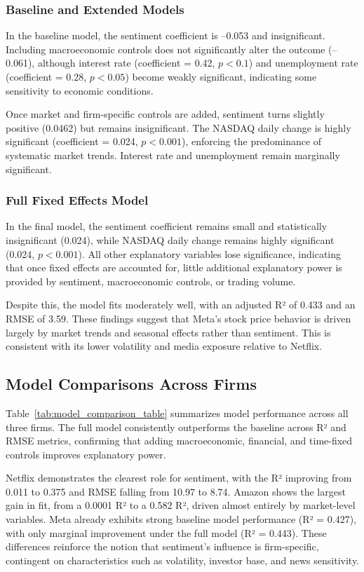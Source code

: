 \documentclass[12pt]{article}
\begin{document}
\subsubsection{Baseline and Extended Models
}
In the baseline model, the sentiment coefficient is –0.053 and insignificant. Including macroeconomic controls does not significantly alter the outcome (–0.061), although interest rate (coefficient = 0.42, $p < 0.1$) and unemployment rate (coefficient = 0.28, $p < 0.05$) become weakly significant, indicating some sensitivity to economic conditions.

Once market and firm-specific controls are added, sentiment turns slightly positive (0.0462) but remains insignificant. The NASDAQ daily change is highly significant (coefficient = 0.024, $p < 0.001$), enforcing the predominance of systematic market trends. Interest rate and unemployment remain marginally significant.

\subsubsection{Full Fixed Effects Model
}
In the final model, the sentiment coefficient remains small and statistically insignificant (0.024), while NASDAQ daily change remains highly significant (0.024, $p < 0.001$). All other explanatory variables lose significance, indicating that once fixed effects are accounted for, little additional explanatory power is provided by sentiment, macroeconomic controls, or trading volume.

Despite this, the model fits moderately well, with an adjusted R² of 0.433 and an RMSE of 3.59. These findings suggest that Meta’s stock price behavior is driven largely by market trends and seasonal effects rather than sentiment. This is consistent with its lower volatility and media exposure relative to Netflix.

\subsection{Model Comparisons Across Firms}
Table~\ref{tab:model_comparison_table} summarizes model performance across all three firms. The full model consistently outperforms the baseline across R² and RMSE metrics, confirming that adding macroeconomic, financial, and time-fixed controls improves explanatory power.

Netflix demonstrates the clearest role for sentiment, with the R² improving from 0.011 to 0.375 and RMSE falling from 10.97 to 8.74. Amazon shows the largest gain in fit, from a 0.0001 R² to a 0.582 R², driven almost entirely by market-level variables. Meta already exhibits strong baseline model performance (R² = 0.427), with only marginal improvement under the full model (R² = 0.443). These differences reinforce the notion that sentiment's influence is firm-specific, contingent on characteristics such as volatility, investor base, and news sensitivity.
\end{document}
